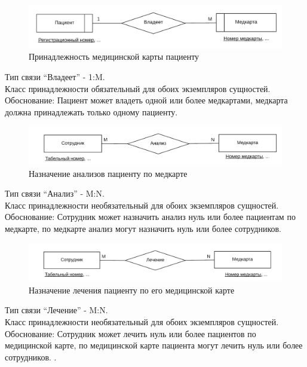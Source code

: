 \documentclass[14pt,a4paper,russian]{extreport}
\begin{document}
\begin{figure}[h!]
        \includegraphics[width=\textwidth]{medcbelpat}
        \caption{Принадлежность медицинской карты пациенту}
        \label{fig:medcbelpat}
\end{figure}

\noindent Тип связи ``Владеет'' - 1:M.\\
Класс принадлежности обязательный для обоих экземпляров сущностей.\\
Обоснование: Пациент может владеть одной или более медкартами, медкарта должна принадлежать
только одному пациенту.

\begin{figure}[h!]
        \includegraphics[width=\textwidth]{cardan}
        \caption{Назначение анализов пациенту по медкарте}
        \label{fig:cardan}
\end{figure}

\noindent Тип связи ``Анализ'' - M:N.\\
Класс принадлежности необязательный для обоих экземпляров сущностей.
Обоснование: Сотрудник может назначить анализ нуль или более пациентам по медкарте, по медкарте
анализ могут назначить нуль или более сотрудников.

\begin{figure}[h!]
        \includegraphics[width=\textwidth]{empcuremedc}
        \caption{Назначение лечения пациенту по его медицинской карте}
        \label{fig:empcuremedc}
\end{figure}
\noindent Тип связи ``Лечение'' - M:N.\\
Класс принадлежности необязательный для обоих экземпляров сущностей.
Обоснование: Сотрудник может лечить нуль или более пациентов по медицинской карте, по
медицинской карте пациента могут лечить нуль или более сотрудников.
.
\end{document}
